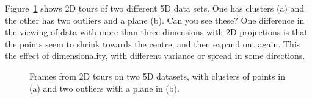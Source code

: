 \documentclass[
  letterpaper,
]{krantz}
\begin{document}
Figure~\ref{fig-tour-intro-pdf} shows 2D tours of two different 5D data
sets. One has clusters (a) and the other has two outliers and a plane
(b). Can you see these? One difference in the viewing of data with more
than three dimensions with 2D projections is that the points seem to
shrink towards the centre, and then expand out again. This the effect of
dimensionality, with different variance or spread in some directions.

\begin{figure}

\begin{minipage}{0.50\linewidth}



\end{minipage}%
%
\begin{minipage}{0.50\linewidth}



\end{minipage}%

\caption{\label{fig-tour-intro-pdf}Frames from 2D tours on two 5D
datasets, with clusters of points in (a) and two outliers with a plane
in (b). }

\end{figure}%
\end{document}
